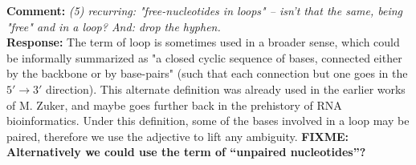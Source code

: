 \documentclass[11pt,hyperref,draft]{article} %
\newcommand{\Answer}[1]{\noindent\textsf{\textbf{Response: }}{\sf#1}\\}
\newcommand{\Comment}[1]{\noindent\textsf{\textbf{Comment: }}{\it#1}\\[.5em]}
\begin{document}
\Comment{(5) recurring: "free-nucleotides in loops" -- isn't that the same, being "free" and in a loop? And: drop the hyphen.}
\Answer{The term of loop is sometimes used in a broader sense, which could be informally summarized as "a closed cyclic sequence of bases, connected either by the backbone or by base-pairs" (such that each connection but one goes in the $5'\to3'$ direction). This alternate definition was already used in the earlier works of M. Zuker, and maybe goes further back in the prehistory of RNA bioinformatics. Under this definition,  some of the bases involved in a loop may be paired, therefore we use the adjective to lift any ambiguity.
\textbf{FIXME: Alternatively we could use the term of ``unpaired nucleotides''?}
}




\end{document}
